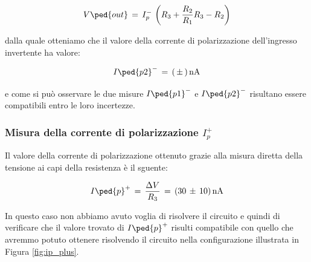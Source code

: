 \begin{equation}
	V\ped{out}\,=\,I_{p}^-\,\left(R_3+\frac{R_2}{R_1}R_3-R_2\right)
\end{equation}

dalla quale otteniamo che il valore della corrente di polarizzazione dell'ingresso invertente ha valore:

\begin{equation}
	I\ped{p2}^-\,=\,(\,\pm\,)\,\SI{}{\nano\ampere}
\end{equation}

e come si può osservare le due misure $I\ped{p1}^-$ e $I\ped{p2}^-$ risultano essere compatibili entro le loro incertezze.

\subsubsection*{Misura della corrente di polarizzazione $I_{p}^+$}

Il valore della corrente di polarizzazione ottenuto grazie alla misura diretta della tensione ai capi della resistenza è il sguente:

\begin{equation}
	I\ped{p}^+\,=\,\frac{\Delta V}{R_3}\,=\,(30\,\pm\,10)\,\SI{}{\nano\ampere}
\end{equation}

In questo caso non abbiamo avuto voglia di risolvere il circuito e quindi di verificare che il valore trovato di $I\ped{p}^+$ risulti compatibile con quello che avremmo potuto ottenere risolvendo il circuito nella configurazione illustrata in Figura \ref{fig:ip_plus}.










